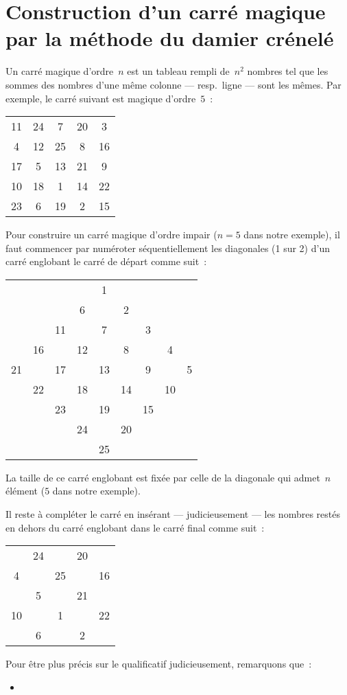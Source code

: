 \section{Construction d'un carr\'e magique par la m\'ethode du damier cr\'enel\'e}
Un carr\'e magique d'ordre~$n$ est un tableau rempli de~$n^{2}$ nombres tel que les sommes
des nombres  d'une   m\^eme colonne ---  resp.\  ligne  ---  sont  les
m\^emes. Par exemple, le carr\'e suivant est magique d'ordre~$5$~:
\par
\begin{center}
  \begin{tabular}{ccccc}
    11 & 24 & 7  & 20 & 3 \\
    4  & 12 & 25 & 8  & 16 \\
    17 & 5  & 13 & 21 & 9\\
    10 & 18 & 1  & 14 & 22\\
    23 & 6  & 19 & 2  & 15
  \end{tabular}
\end{center}
Pour construire un carr\'e magique d'ordre  impair (${n=5}$ dans notre
exemple), il faut commencer par
num\'eroter s\'equentiellement les  diagonales (1 sur 2) d'un
carr\'e englobant le carr\'e de d\'epart comme suit~:
\par
\begin{center}
  \begin{tabular}{cc|ccccc|cc}
      &  &  &  & 1&  &  &  & \\ 
      &  &  & 6&  & 2&  &  & \\ 
      &  &11&  & 7&  & 3&  &   \\\hline
      &16&  &12&  & 8&  & 4& \\
    21&  &17&  &13&  & 9&  & 5\\
      &22&  &18&  &14&  &10&\\
      &  &23&  &19&  &15&  & \\\hline
      &  &  &24&  &20&  &  & \\ 
      &  &  &  &25&  &  &  & 
  \end{tabular}
\end{center}
La taille de ce carr\'e englobant est fix\'ee par celle de la diagonale qui
admet~$n$ \'el\'ement ($5$ dans notre exemple).
\par\medskip
Il reste \`a compl\'eter le carr\'e en ins\'erant --- judicieusement ---
les nombres rest\'es en dehors du carr\'e englobant dans le carr\'e final 
comme suit~:
\par
\begin{center}
  \begin{tabular}{ccccc}
       & 24 &    & 20 &   \\
    4  &    & 25 &    & 16 \\
       & 5  &    & 21 & \\
    10 &    & 1  &    & 22\\
       & 6  &    & 2  &  
  \end{tabular}
\end{center}
Pour \^etre plus pr\'ecis sur le qualificatif judicieusement,
remarquons que~:
\begin{itemize}
\item 
\end{itemize}

